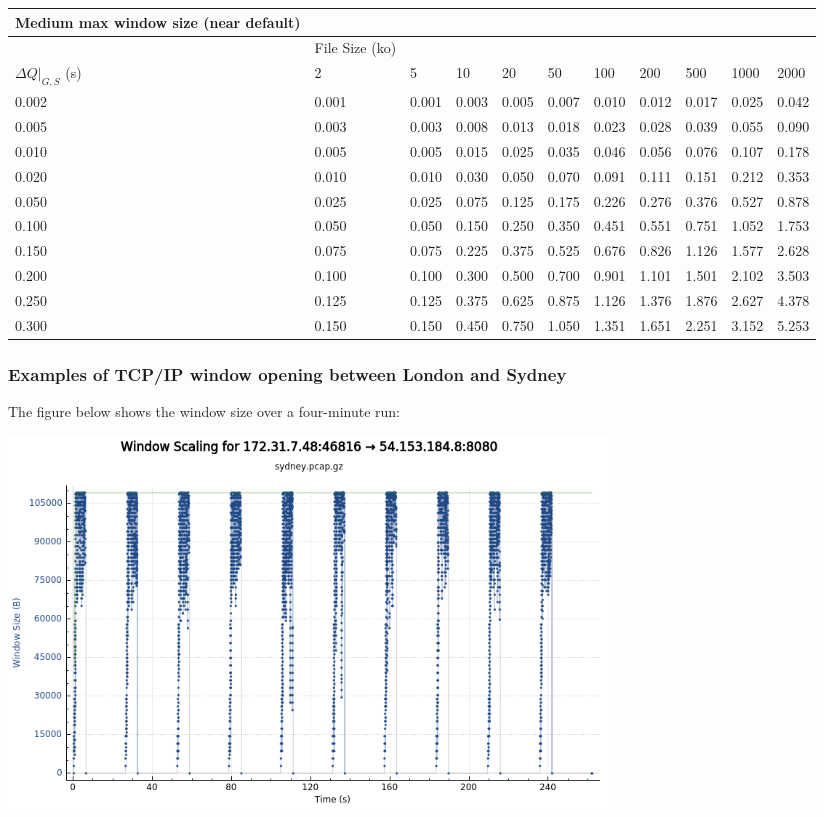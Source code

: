 \documentclass[11pt,a4paper]{article}
\begin{document}
\begin{longtable}[]{@{}lllllllllll@{}}
\toprule
Medium max window size (near default) & & & & & & & & & &\tabularnewline
\midrule
\endhead
& File Size (ko) & & & & & & & & &\tabularnewline
$\Delta{}Q|_{G,S}$  (s) & 2 & 5 & 10 & 20 & 50 & 100 & 200 &
500 & 1000 & 2000\tabularnewline
0.002 & 0.001 & 0.001 & 0.003 & 0.005 & 0.007 & 0.010 & 0.012 & 0.017 &
0.025 & 0.042\tabularnewline
0.005 & 0.003 & 0.003 & 0.008 & 0.013 & 0.018 & 0.023 & 0.028 & 0.039 &
0.055 & 0.090\tabularnewline
0.010 & 0.005 & 0.005 & 0.015 & 0.025 & 0.035 & 0.046 & 0.056 & 0.076 &
0.107 & 0.178\tabularnewline
0.020 & 0.010 & 0.010 & 0.030 & 0.050 & 0.070 & 0.091 & 0.111 & 0.151 &
0.212 & 0.353\tabularnewline
0.050 & 0.025 & 0.025 & 0.075 & 0.125 & 0.175 & 0.226 & 0.276 & 0.376 &
0.527 & 0.878\tabularnewline
0.100 & 0.050 & 0.050 & 0.150 & 0.250 & 0.350 & 0.451 & 0.551 & 0.751 &
1.052 & 1.753\tabularnewline
0.150 & 0.075 & 0.075 & 0.225 & 0.375 & 0.525 & 0.676 & 0.826 & 1.126 &
1.577 & 2.628\tabularnewline
0.200 & 0.100 & 0.100 & 0.300 & 0.500 & 0.700 & 0.901 & 1.101 & 1.501 &
2.102 & 3.503\tabularnewline
0.250 & 0.125 & 0.125 & 0.375 & 0.625 & 0.875 & 1.126 & 1.376 & 1.876 &
2.627 & 4.378\tabularnewline
0.300 & 0.150 & 0.150 & 0.450 & 0.750 & 1.050 & 1.351 & 1.651 & 2.251 &
3.152 & 5.253\tabularnewline
\bottomrule
\end{longtable}

\subsubsection{Examples of TCP/IP window opening between London and Sydney}
\label{examples-of-tcpip-window-opening-between-london-and-sydney}

The figure below shows the window size over a four-minute run:

\includegraphics[width=6.27083in,height=3.88889in]{./media/image1.png}
\end{document}
